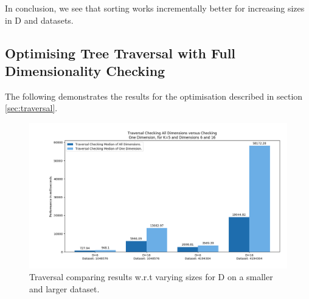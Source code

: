 





In conclusion, we see that sorting works incrementally better for increasing sizes in D and datasets. 


\subsection{Optimising Tree Traversal with Full Dimensionality Checking}

The following demonstrates the results for the optimisation described in section \ref{sec:traversal}. 


\begin{figure}[H]
\centering
\includegraphics[width=1\textwidth]{pics/plot-figs/trav-k5-no-1.png}
\caption{Traversal comparing results w.r.t varying sizes for D on a smaller and larger dataset.}
\label{fig:trav1}
\end{figure}

